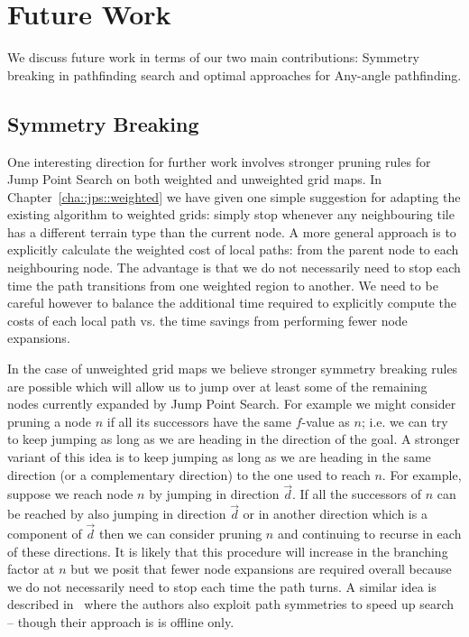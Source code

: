 \section{Future Work}
\label{cha::conclusion::future}
We discuss future work in terms of our two main contributions: Symmetry breaking
in pathfinding search and optimal approaches for Any-angle pathfinding.

\subsection{Symmetry Breaking}
One interesting direction for further work involves stronger pruning rules for
Jump Point Search on both weighted and unweighted grid maps.  In
Chapter~\ref{cha::jps::weighted} we have given one simple suggestion for
adapting the existing algorithm to weighted grids: simply stop whenever any
neighbouring tile has a different terrain type than the current node.  A more
general approach is to explicitly calculate the weighted cost of local paths:
from the parent node to each neighbouring node.  The advantage is that we do
not necessarily need to stop each time the path transitions from one weighted
region to another. We need to be careful however to balance the additional
time required to explicitly compute the costs of each local path vs. the time
savings from performing fewer node expansions.

In the case of unweighted grid maps we believe stronger symmetry breaking
rules are possible which will allow us to jump over at least some of the
remaining nodes currently expanded by Jump Point Search. For example we might
consider pruning a node $n$ if all its successors have the same $f$-value as
$n$; i.e.  we can try to keep jumping as long as we are heading in the
direction of the goal.  A stronger variant of this idea is to keep jumping as
long as we are heading in the same direction (or a complementary direction) to
the one used to reach $n$. For example, suppose we reach node $n$ by jumping
in direction $\vec{d}$.  If all the successors of $n$ can be reached by also
jumping in direction $\vec{d}$ or in another direction which is a component of
$\vec{d}$ then we can consider pruning $n$ and continuing to recurse in each
of these directions. It is likely that this procedure will increase in the 
branching factor at $n$ but we posit that fewer node expansions are required 
overall because we do not necessarily need to stop each time the path turns. 
A similar idea is described in~\citep{urasKH13} where the authors also exploit
path symmetries to speed up search -- though their approach is is offline
only.

